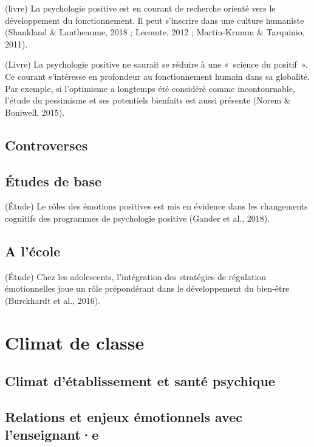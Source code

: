 \documentclass[
  french,
]{article}
\begin{document}
(livre) La psychologie positive est en courant de recherche orienté vers le développement du fonctionnement. Il peut s'inscrire dans une culture humaniste (Shankland \& Lantheaume, 2018 ; Lecomte, 2012 ; Martin-Krumm \& Tarquinio, 2011).

(Livre) La psychologie positive ne saurait se réduire à une «~science du positif~». Ce courant s'intéresse en profondeur au fonctionnement humain dans sa globalité. Par exemple, si l'optimisme a longtemps été considéré comme incontournable, l'étude du pessimisme et ses potentiels bienfaits est aussi présente (Norem \& Boniwell, 2015).

\hypertarget{controverses}{%
\subsection{Controverses}\label{controverses}}

\hypertarget{uxe9tudes-de-base}{%
\subsection{Études de base}\label{uxe9tudes-de-base}}

(Étude) Le rôles des émotions positives est mis en évidence dans les changements cognitifs des programmes de psychologie positive (Gander et al., 2018).

\hypertarget{a-luxe9cole}{%
\subsection{A l'école}\label{a-luxe9cole}}

(Étude) Chez les adolescents, l'intégration des stratégies de régulation émotionnelles joue un rôle prépondérant dans le développement du bien-être (Burckhardt et al., 2016).

\hypertarget{climat-de-classe}{%
\section{Climat de classe}\label{climat-de-classe}}

\hypertarget{climat-duxe9tablissement-et-santuxe9-psychique}{%
\subsection{Climat d'établissement et santé psychique}\label{climat-duxe9tablissement-et-santuxe9-psychique}}

\hypertarget{relations-et-enjeux-uxe9motionnels-avec-lenseignante}{%
\subsection{Relations et enjeux émotionnels avec l'enseignant·e}\label{relations-et-enjeux-uxe9motionnels-avec-lenseignante}}
\end{document}
